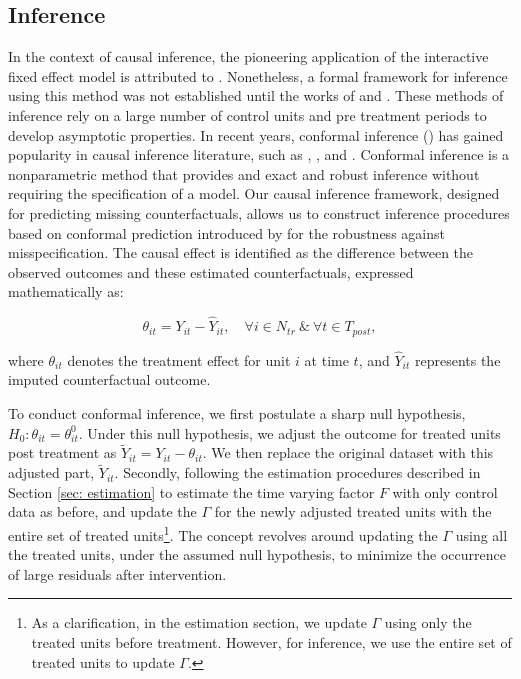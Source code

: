 \documentclass[12pt]{article}
\begin{document}
\subsection{Inference}

In the context of causal inference, the pioneering application of the interactive fixed effect model is attributed to \cite{hsiao2012panel}. Nonetheless, a formal framework for inference using this method was not established until the works of \cite{chan2016policy} and \cite{li2018inference}. These methods of inference rely on a large number of control units and pre treatment periods to develop asymptotic properties. In recent years, conformal inference (\cite{chernozhukov2021exact}) has gained popularity in causal inference literature, such as \cite{ben2021augmented}, \cite{roth2023s}, and \cite{imbens2024causal}. Conformal inference is a nonparametric method that provides and exact and robust inference without requiring the specification of a model. Our causal inference framework, designed for predicting missing counterfactuals, allows us to construct inference procedures based on conformal prediction introduced by \cite{shafer2008tutorial} for the robustness against misspecification. The causal effect is identified as the difference between the observed outcomes and these estimated counterfactuals, expressed mathematically as:

\begin{equation*}
\theta_{it} = Y_{it} - \hat{Y}_{it}, \quad \forall i \in N_{tr} \ \& \ \forall t \in T_{post},
\end{equation*}

\noindent where $\theta_{it}$ denotes the treatment effect for unit $i$ at time $t$, and $\hat{Y}_{it}$ represents the imputed counterfactual outcome. 
    
To conduct conformal inference, we first postulate a sharp null hypothesis, $H_0: \theta_{it} = \theta_{it}^0$. Under this null hypothesis, we adjust the outcome for treated units post treatment as $\tilde{Y}_{it} = Y_{it} - \theta_{it}$. We then replace the original dataset with this adjusted part, $\tilde{Y}_{it}$. Secondly, following the estimation procedures described in Section \ref{sec: estimation} to estimate the time varying factor $F$ with only control data as before, and update the $\Gamma$ for the newly adjusted treated units with the entire set of treated units\footnote{As a clarification, in the estimation section, we update $\Gamma$ using only the treated units before treatment. However, for inference, we use the entire set of treated units to update 
$\Gamma$.}. The concept revolves around updating the $\Gamma$ using all the treated units, under the assumed null hypothesis, to minimize the occurrence of large residuals after intervention.
\end{document}
